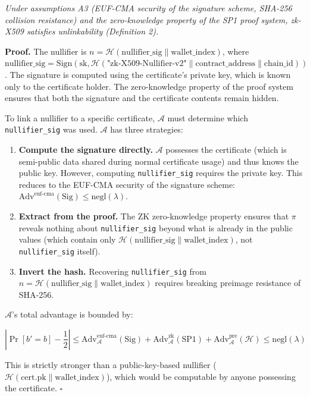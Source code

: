 \documentclass[11pt, a4paper]{article}
\begin{document}
\emph{Under assumptions A3 (EUF-CMA security of the signature scheme,
SHA-256 collision resistance) and the zero-knowledge property of the SP1
proof system, zk-X509 satisfies unlinkability (Definition 2).}

\textbf{Proof.} The nullifier is
\(n = \mathcal{H}(\text{nullifier\_sig} \| \text{wallet\_index})\),
where
\(\text{nullifier\_sig} = \text{Sign}(\text{sk}, \mathcal{H}(\text{"zk-X509-Nullifier-v2"} \| \text{contract\_address} \| \text{chain\_id}))\).
The signature is computed using the certificate's private key, which is
known only to the certificate holder. The zero-knowledge property of the
proof system ensures that both the signature and the certificate
contents remain hidden.

To link a nullifier to a specific certificate, \(\mathcal{A}\) must
determine which \texttt{nullifier\_sig} was used. \(\mathcal{A}\) has
three strategies:

\begin{enumerate}
\def\labelenumi{(\alph{enumi})}
\item
  \textbf{Compute the signature directly.} \(\mathcal{A}\) possesses the
  certificate (which is semi-public data shared during normal
  certificate usage) and thus knows the public key. However, computing
  \texttt{nullifier\_sig} requires the private key. This reduces to the
  EUF-CMA security of the signature scheme:
  \(\text{Adv}^{\text{euf-cma}}(\text{Sig}) \leq \text{negl}(\lambda)\).
\item
  \textbf{Extract from the proof.} The ZK zero-knowledge property
  ensures that \(\pi\) reveals nothing about \texttt{nullifier\_sig}
  beyond what is already in the public values (which contain only
  \(\mathcal{H}(\text{nullifier\_sig} \| \text{wallet\_index})\), not
  \texttt{nullifier\_sig} itself).
\item
  \textbf{Invert the hash.} Recovering \texttt{nullifier\_sig} from
  \(n = \mathcal{H}(\text{nullifier\_sig} \| \text{wallet\_index})\)
  requires breaking preimage resistance of SHA-256.
\end{enumerate}

\(\mathcal{A}\)'s total advantage is bounded by:

\[\left| \Pr[b' = b] - \frac{1}{2} \right| \leq \text{Adv}_{\mathcal{A}}^{\text{euf-cma}}(\text{Sig}) + \text{Adv}_{\mathcal{A}}^{\text{zk}}(\text{SP1}) + \text{Adv}_{\mathcal{A}}^{\text{pre}}(\mathcal{H}) \leq \text{negl}(\lambda)\]

This is strictly stronger than a public-key-based nullifier
(\(\mathcal{H}(\text{cert.pk} \| \text{wallet\_index})\)), which would
be computable by anyone possessing the certificate. \(\square\)
\end{document}
